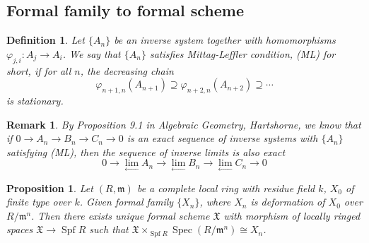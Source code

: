 \documentclass{ctexart}
\newtheorem{definition}{Definition}[section]
\newtheorem{remark}{Remark}[section]
\newtheorem{proposition}{Proposition}[section]
\newcommand{\spec}{\operatorname{Spec}}
\newcommand{\spf}{\operatorname{Spf}}
\newcommand{\inverselimit}{\underset{\longleftarrow}{\lim}}
\begin{document}
\subsection{Formal family to formal scheme}
\label{subsection:Algebraization_of_Formal_Moduli_Formal_family_to_formal_scheme}

\begin{definition}
    Let $\{A_{n}\}$ be an inverse system together with homomorphisms $\varphi_{j,i}: A_{j} \rightarrow A_{i}$.
    We say that $\{A_{n}\}$ satisfies Mittag-Leffler condition, (ML) for short, 
    if for all $n$, the decreasing chain 
    \begin{equation}
        \varphi_{n + 1, n}(A_{n + 1}) \supseteq \varphi_{n + 2, n}(A_{n + 2}) \supseteq \cdots 
    \end{equation}
    is stationary.
\end{definition}
\begin{remark}
    By Proposition 9.1 in Algebraic Geometry, Hartshorne, 
    we know that if $0 \rightarrow A_{n} \rightarrow B_{n} \rightarrow C_{n} \rightarrow 0$ is an exact sequence of inverse systems with $\{A_{n}\}$ satisfying (ML),
    then the sequence of inverse limits is also exact
    \begin{equation}
        0 \longrightarrow \inverselimit A_{n} \longrightarrow \inverselimit B_{n} \longrightarrow \inverselimit C_{n} \longrightarrow 0
    \end{equation}
\end{remark}
\begin{proposition}
    Let $(R, \mathfrak{m})$ be a complete local ring with residue field $k$, $X_{0}$ of finite type over $k$.
    Given formal family $\{X_{n}\}$, where $X_{n}$ is deformation of $X_{0}$ over $R/\mathfrak{m}^{n}$.
    Then there exists unique formal scheme $\mathfrak{X}$ with morphism of locally ringed spaces $\mathfrak{X} \rightarrow \spf R$ such that $\mathfrak{X} \times_{\spf R} \spec (R/\mathfrak{m}^{n}) \cong X_{n}$.
    \label{Proposition 5.1}
\end{proposition}
\end{document}
